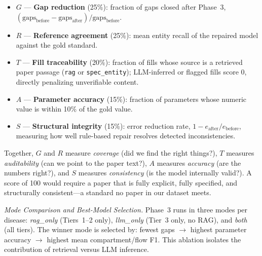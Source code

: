 \begin{itemize}[leftmargin=*]
  \item $G$ — \textbf{Gap reduction} (25\%): fraction of gaps closed after Phase~3,
        $(\text{gaps}_\text{before} - \text{gaps}_\text{after}) / \text{gaps}_\text{before}$.
  \item $R$ — \textbf{Reference agreement} (25\%): mean entity recall of the
        repaired model against the gold standard.
  \item $T$ — \textbf{Fill traceability} (20\%): fraction of fills whose source
        is a retrieved paper passage (\texttt{rag} or \texttt{spec\_entity});
        LLM-inferred or flagged fills score 0, directly penalizing unverifiable content.
  \item $A$ — \textbf{Parameter accuracy} (15\%): fraction of parameters whose
        numeric value is within 10\% of the gold value.
  \item $S$ — \textbf{Structural integrity} (15\%): error reduction rate,
        $1 - e_\text{after}/e_\text{before}$, measuring how well rule-based repair
        resolves detected inconsistencies.
\end{itemize}

Together, $G$ and $R$ measure \emph{coverage} (did we find the right things?), $T$
measures \emph{auditability} (can we point to the paper text?), $A$ measures
\emph{accuracy} (are the numbers right?), and $S$ measures \emph{consistency}
(is the model internally valid?). A score of 100 would require a paper that is
fully explicit, fully specified, and structurally consistent---a standard no paper
in our dataset meets.

\textit{Mode Comparison and Best-Model Selection.}
Phase~3 runs in three modes per disease: \emph{rag\_only} (Tiers~1--2 only),
\emph{llm\_only} (Tier~3 only, no RAG), and \emph{both} (all tiers). The winner mode
is selected by: fewest gaps $\to$ highest parameter accuracy $\to$ highest mean
compartment/flow F1. This ablation isolates the contribution of retrieval versus
LLM inference.
